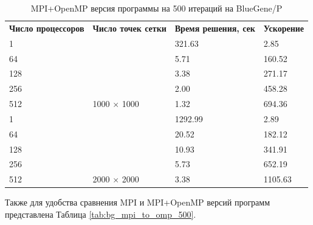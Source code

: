 \documentclass[12pt, a4paper]{article}
\begin{document}
        \begin{table}[H]
            \centering
            \caption{MPI+OpenMP версия программы на 500 итераций на BlueGene/P}
            \label{tab:bg_omp500}
            \begin{tabular}{llll}
            \rowcolor[HTML]{C0C0C0}
            \textbf{Число процессоров} & \textbf{Число точек сетки}                   & \textbf{Время решения, сек} & \textbf{Ускорение} \\
            \rowcolor[HTML]{EFEFEF}
            1                          & \multicolumn{1}{c}{\cellcolor[HTML]{EFEFEF}} & 321.63                      & 2.85               \\
            64                         &                                              & 5.71                        & 160.52             \\
            128                        &                                              & 3.38                        & 271.17             \\
            256                        &                                              & 2.00                        & 458.28             \\
            512                        & \multirow{-4}{*}{1000 $\times$ 1000}         & 1.32                        & 694.36             \\
            \rowcolor[HTML]{EFEFEF}
            1                          &                                              & 1292.99                     & 2.89               \\
            64                         &                                              & 20.52                       & 182.12             \\
            128                        &                                              & 10.93                       & 341.91             \\
            256                        &                                              & 5.73                        & 652.19             \\
            512                        & \multirow{-4}{*}{2000 $\times$ 2000}         & 3.38                        & 1105.63
            \end{tabular}
        \end{table}

        Также для удобства сравнения MPI и MPI+OpenMP версий программ представлена Таблица \ref{tab:bg_mpi_to_omp_500}.
\end{document}
